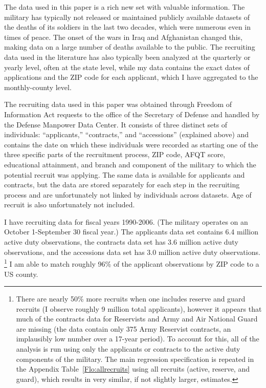 \documentclass[12pt] {article}
\begin{document}
The data used in this paper is a rich new set with valuable information.
The military has typically not released or maintained publicly available
datasets of the deaths of its soldiers in the last two decades, which
were numerous even in times of peace. The onset of the wars in Iraq
and Afghanistan changed this, making data on a large number of
deaths available to the public. The recruiting data used in the literature has also typically been analyzed at the quarterly or yearly level, often at the state level, while my data contains the exact dates of applications and the ZIP code for each
applicant, which I have aggregated to the monthly-county level. 

The recruiting data used in this paper was obtained through Freedom
of Information Act requests to the office of the Secretary of Defense
and handled by the Defense Manpower Data Center. It consists of three
distinct sets of individuals: {}``applicants,'' {}``contracts,''
and {}``accessions'' (explained above) and contains the date on
which these individuals were recorded as starting one of the three
specific parts of the recruitment process, ZIP code, AFQT score, educational
attainment, and branch and component of the military to which the
potential recruit was applying. The same data is available for applicants
and contracts, but the data are stored separately for each step in
the recruiting process and are unfortunately not linked by individuals
across datasets. Age of recruit is also unfortunately not included.

I have recruiting data for fiscal years 1990-2006. (The military operates
on an October 1-September 30 fiscal year.) The applicants data set
contains 6.4 million active duty observations, the contracts data
set has 3.6 million active duty observations, and the accessions data
set has 3.0 million active duty observations. \footnote{There are nearly 50\%
more recruits when one includes reserve and guard recruits (I
observe roughly 9 million total applicants), however it appears that
much of the contracts data for Reservists and Army and Air National
Guard are missing (the data contain only 375 Army Reservist contracts,
an implausibly low number over a 17-year period). To account for this,
all of the analysis is run using only the applicants or contracts
to the active duty components of the military. The main regression specification is repeated in the Appendix Table~\ref{Flo:allrecruits} using all recruits (active, reserve, and guard), which results in very similar, if not slightly larger, estimates.} I am able to match roughly 96\% of the applicant observations by ZIP code to a US county.
\end{document}
